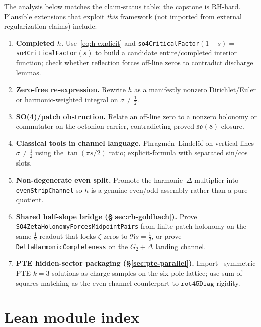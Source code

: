 \documentclass[11pt]{amsart}
\begin{document}
The analysis below matches the claim-status table: the capstone is RH-hard.
Plausible extensions that exploit \emph{this} framework (not imported from
external regularization claims) include:
\begin{enumerate}[label=\textbf{\Alph*.},nosep]
\item \textbf{Completed $h$.}  Use~\eqref{eq:h-explicit} and
      \texttt{so4CriticalFactor}$(1-s)=-$ \texttt{so4CriticalFactor}$(s)$ to
      build a candidate entire/completed interior function; check whether
      reflection forces off-line zeros to contradict discharge lemmas.
\item \textbf{Zero-free re-expression.}  Rewrite $h$ as a manifestly nonzero
      Dirichlet/Euler or harmonic-weighted integral on $\sigma\neq\tfrac12$.
\item \textbf{SO(4)/patch obstruction.}  Relate an off-line zero to a nonzero
      holonomy or commutator on the octonion carrier, contradicting proved
      $\mathfrak{so}(8)$ closure.
\item \textbf{Classical tools in channel language.}  Phragm\'en--Lindel\"of on
      vertical lines $\sigma\neq\tfrac12$ using the $\tan(\pi s/2)$ ratio;
      explicit-formula with separated sin/cos slots.
\item \textbf{Non-degenerate even split.}  Promote the harmonic--$\Delta$
      multiplier into \texttt{evenStripChannel} so $h$ is a genuine even/odd
      assembly rather than a pure quotient.
\item \textbf{Shared half-slope bridge (\S\ref{sec:rh-goldbach}).}  Prove
      \texttt{SO4ZetaHolonomyForcesMidpointPairs} from finite patch holonomy on
      the same $\tfrac12$ readout that locks $\zeta$-zeros to $\Re s=\tfrac12$,
      or prove \texttt{DeltaHarmonicCompleteness} on the $G_2+\Delta$ landing
      channel.
\item \textbf{PTE hidden-sector packaging (\S\ref{sec:pte-parallel}).}
      Import~\cite{LeeTakahashiTsai2026PTE} symmetric PTE-$k=3$ solutions as
      charge samples on the six-pole lattice; use sum-of-squares matching as the
      even-channel counterpart to $\texttt{rot45Diag}$ rigidity.
\end{enumerate}

\section{Lean module index}\label{sec:lean-index}
\end{document}
